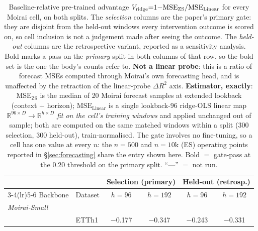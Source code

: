 \begin{table}[t]
\centering
\caption{Baseline-relative pre-trained advantage $V_{\text{ridge}} {=} 1 {-}
\text{MSE}_{\text{ZS}}/\text{MSE}_{\text{Linear}}$ for every Moirai cell, on both
splits. The \emph{selection} columns are the paper's primary gate: they are disjoint from
the held-out windows every intervention outcome is scored on, so cell inclusion is not a
judgement made after seeing the outcome. The \emph{held-out} columns are the retrospective
variant, reported as a sensitivity analysis. Bold marks a pass on the \emph{primary} split
in both columns of that row, so the bold set is the one the body's counts refer to.
\textbf{Not a linear probe}: this is a ratio of forecast MSEs computed through
Moirai's own forecasting head, and is unaffected by the retraction of the
linear-probe $\Delta R^2$ axis.
\textbf{Estimator, exactly}: $\text{MSE}_{\text{ZS}}$ is the median of 20
Moirai forecast samples at extended lookback (context $+$ horizon);
$\text{MSE}_{\text{Linear}}$ is a single lookback-96 ridge-OLS linear map
$\mathbb{R}^{96 \times D} {\to} \mathbb{R}^{h \times D}$ \emph{fit on the
cell's training windows} and applied unchanged out of sample; both are computed
on the same matched windows within a split (300 selection, 300
held-out), train-normalised.
The gate involves no fine-tuning, so a cell has one value at every $n$: the
$n{=}500$ and $n{=}10$k (ES) operating points reported in
\S\ref{sec:forecasting} share the entry shown here.
Bold ${=}$ gate-pass at the $0.20$ threshold on the primary split. ``---'' ${=}$ not run.}
\label{tab:r2task}
\small
\begin{tabular}{ll cc cc}
\toprule
& & \multicolumn{2}{c}{Selection (primary)} & \multicolumn{2}{c}{Held-out (retrosp.)} \\
\cmidrule(lr){3-4}\cmidrule(lr){5-6}
Backbone & Dataset & $h{=}96$ & $h{=}192$ & $h{=}96$ & $h{=}192$ \\
\midrule
\multicolumn{6}{l}{\textit{Moirai-Small}} \\
 & ETTh1                  & $-$0.177 & $-$0.347 & $-$0.243 & $-$0.331 \\

\end{tabular}
\end{table}
